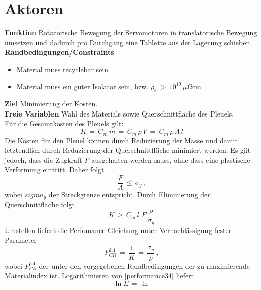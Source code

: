 \section{Aktoren}
\textbf{Funktion} Rotatorische Bewegung der Servomotoren in translatorische Bewegung umsetzen und dadurch pro Durchgang eine Tablette aus der Lagerung schieben.\\
\textbf{Randbedingungen/Constraints}
\begin{itemize}
	\item Material muss recyclebar sein
	\item Material muss ein guter Isolator sein, bzw. $\rho_e\,>\,10^{19}\,\mu\Omega$cm
\end{itemize}
\textbf{Ziel} Minimierung der Kosten.\\
\textbf{Freie Variablen} Wahl des Materials sowie Querschnittfläche des Pleuels.\\
Für die Gesamtkosten des Pleuels gilt:
\begin{equation}
	K\,=\,C_m\,m\,=\,C_m\,\rho\,V\,=\,C_m\,\rho\,A\,l
\end{equation}
Die Kosten für den Pleuel können durch Reduzierung der Masse und damit letztendlich durch Reduzierung der Querschnittfläche minimiert werden. Es gilt jedoch, dass die Zugkraft $F$ ausgehalten werden muss, ohne dass eine plastische Verformung eintritt. Daher folgt
\begin{equation}
	\frac{F}{A}\,\le\,\sigma_y\,,
\end{equation}
wobei $sigma_y$ der Streckgrenze entspricht.
Durch Eliminierung der Querschnittfläche folgt
\begin{equation}
K\,\ge\,C_m\,l\,\,F\,\frac{\rho}{\sigma_y}
\end{equation}
Umstellen liefert die Perfomance-Gleichung unter Vernachlässigung fester Parameter
\begin{equation}\label{performance34}
P_{CR}^{3.4}\,=\,\frac{1}{K}\,=\,\frac{\sigma_y}{\rho}\,,
\end{equation}
wobei $P_{CR}^{3.4}$ der unter den vorgegebenen Randbedingungen der zu maximierende Materialindex ist.
Logarithmieren von \ref{performance34} liefert
\begin{equation}\label{logarithmus34}
\ln{E}\,=\,\ln
\end{equation}